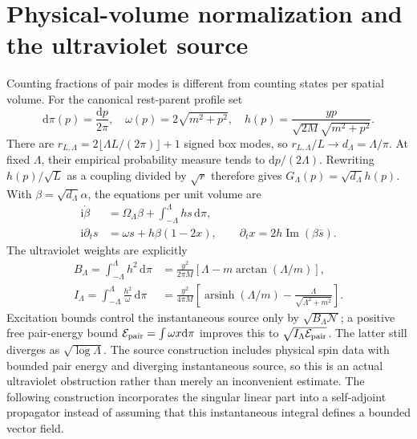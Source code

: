 \documentclass[11pt,a4paper,oneside]{book}
\theoremstyle{plain}
\theoremstyle{definition}
\theoremstyle{remark}
\newcommand{\dd}{\mathrm d}
\newcommand{\ii}{\mathrm i}
\newcommand{\src}[2]{\cite{#1}}
\begin{document}
\section{Physical-volume normalization and the ultraviolet source}
\label{sec:collective-volume-normalization}
Counting fractions of pair modes is different from counting states per
spatial volume.  For the canonical rest-parent profile set
\begin{equation}
 \dd\pi(p)=\frac{\dd p}{2\pi},\quad
 \omega(p)=2\sqrt{m^2+p^2},\quad
 h(p)=\frac{yp}{\sqrt{2M}\sqrt{m^2+p^2}}.
 \label{eq:collective-physical-profile}
\end{equation}
There are $r_{L,\Lambda}=2\lfloor\Lambda L/(2\pi)\rfloor+1$ signed
box modes, so $r_{L,\Lambda}/L\to d_\Lambda=\Lambda/\pi$.
At fixed $\Lambda$, their empirical probability measure tends to
$\dd p/(2\Lambda)$.  Rewriting $h(p)/\sqrt L$ as a coupling divided by
$\sqrt r$ therefore gives $G_\Lambda(p)=\sqrt{d_\Lambda}h(p)$.
With $\beta=\sqrt{d_\Lambda}\alpha$, the equations per unit volume are
\begin{equation}
 \begin{split}
 \ii\dot\beta&=\Omega_\Lambda\beta+
                     \int_{-\Lambda}^{\Lambda}hs\,\dd\pi,\\
 \ii\partial_t s&=\omega s+h\beta(1-2x),\qquad
 \partial_t x=2h\operatorname{Im}(\beta\bar s).
 \end{split}
 \label{eq:physical-collective-cutoff}
\end{equation}
The ultraviolet weights are explicitly
\begin{equation}
 \begin{split}
 B_\Lambda=\int_{-\Lambda}^{\Lambda}h^2\,\dd\pi
 &=\frac{y^2}{2\pi M}[\Lambda-m\arctan(\Lambda/m)],\\
 I_\Lambda=\int_{-\Lambda}^{\Lambda}\frac{h^2}{\omega}\,\dd\pi
 &=\frac{y^2}{4\pi M}\left[
 \operatorname{arsinh}(\Lambda/m)-\frac\Lambda{\sqrt{\Lambda^2+m^2}}\right].
 \end{split}
 \label{eq:collective-ultraviolet-weights}
\end{equation}
Excitation bounds control the instantaneous source only by
$\sqrt{B_\Lambda\mathcal N}$; a positive free pair-energy bound
$\mathcal E_{\rm pair}=\int\omega x\dd\pi$ improves this to
$\sqrt{I_\Lambda\mathcal E_{\rm pair}}$.  The latter still diverges
as $\sqrt{\log\Lambda}$.  The source construction includes physical
spin data with bounded pair energy and diverging instantaneous source,
so this is an actual ultraviolet obstruction rather than merely an
inconvenient estimate.  The following construction incorporates the
singular linear part into a self-adjoint propagator instead of assuming
that this instantaneous integral defines a bounded vector field.
\src{R20}{prop:v20v64-volume,thm:v20v64-source}
\end{document}
